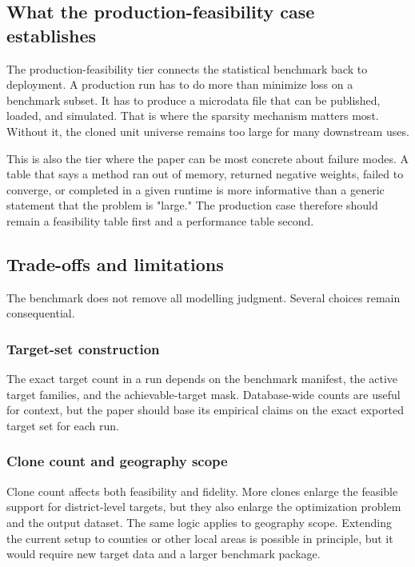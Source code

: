 \subsection{What the production-feasibility case establishes}

The production-feasibility tier connects the statistical benchmark back to deployment. A production
run has to do more than minimize loss on a benchmark subset. It has to produce a microdata file
that can be published, loaded, and simulated. That is where the sparsity mechanism matters most.
Without it, the cloned unit universe remains too large for many downstream uses.

This is also the tier where the paper can be most concrete about failure modes. A table that says a
method ran out of memory, returned negative weights, failed to converge, or completed in a given
runtime is more informative than a generic statement that the problem is "large." The production
case therefore should remain a feasibility table first and a performance table second.

\subsection{Trade-offs and limitations}

The benchmark does not remove all modelling judgment. Several choices remain consequential.

\subsubsection{Target-set construction}

The exact target count in a run depends on the benchmark manifest, the active target families, and
the achievable-target mask. Database-wide counts are useful for context, but the paper should base
its empirical claims on the exact exported target set for each run.

\subsubsection{Clone count and geography scope}

Clone count affects both feasibility and fidelity. More clones enlarge the feasible support for
district-level targets, but they also enlarge the optimization problem and the output dataset. The
same logic applies to geography scope. Extending the current setup to counties or other local areas
is possible in principle, but it would require new target data and a larger benchmark package.

